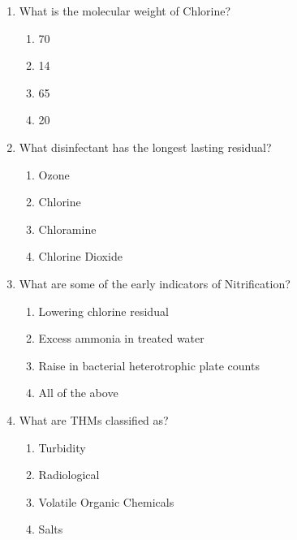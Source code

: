 \begin{enumerate}
\item  What is the molecular weight of Chlorine?\\
\begin{enumerate}
\item 70\\
\item 14\\
\item 65\\
\item 20
\end{enumerate}

\item  What disinfectant has the longest lasting residual?\\
\begin{enumerate}
\item Ozone\\
\item Chlorine\\
\item Chloramine\\
\item Chlorine Dioxide
\end{enumerate}

\item  What are some of the early indicators of Nitrification?\\
\begin{enumerate}
\item Lowering chlorine residual\\
\item Excess ammonia in treated water\\
\item Raise in bacterial heterotrophic plate counts\\
\item All of the above
\end{enumerate}

\item  What are THMs classified as?\\
\begin{enumerate}
\item Turbidity\\
\item Radiological\\
\item Volatile Organic Chemicals\\
\item Salts
\end{enumerate}


\end{enumerate}
